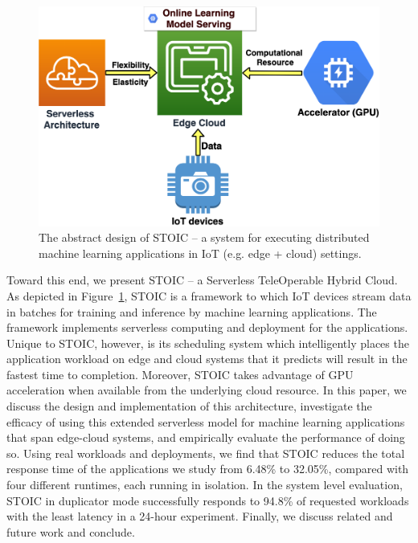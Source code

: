 \begin{figure}
    \centering
    \includegraphics[scale=0.25]{figures/edge}
    \caption{The abstract design of STOIC -- a system for executing distributed machine learning applications in IoT (e.g. edge + cloud) settings.
\label{fig:edge}}
\end{figure}

Toward this end, we present STOIC -- a Serverless TeleOperable Hybrid Cloud. As depicted in Figure~\ref{fig:edge}, STOIC is a framework to which IoT devices stream data in batches for training and inference by machine learning applications.  The framework implements serverless computing and deployment for the applications. Unique to STOIC, however, is its scheduling system which intelligently places the application workload on edge and cloud systems that it predicts will result in the fastest time to completion. Moreover, STOIC takes advantage of GPU acceleration when available from the underlying cloud resource. In this paper, we discuss the design and implementation of this architecture, investigate the efficacy of using this extended serverless model for machine learning applications that span edge-cloud systems, and  empirically evaluate the performance of doing so. Using real workloads and deployments, we find that STOIC reduces the total response time of the applications we study from 6.48\% to 32.05\%, compared with four different runtimes, each running in isolation. In the system level evaluation, STOIC in duplicator mode successfully responds to 94.8\% of requested workloads with the least latency in a 24-hour experiment. Finally, we discuss related and future work and conclude.
